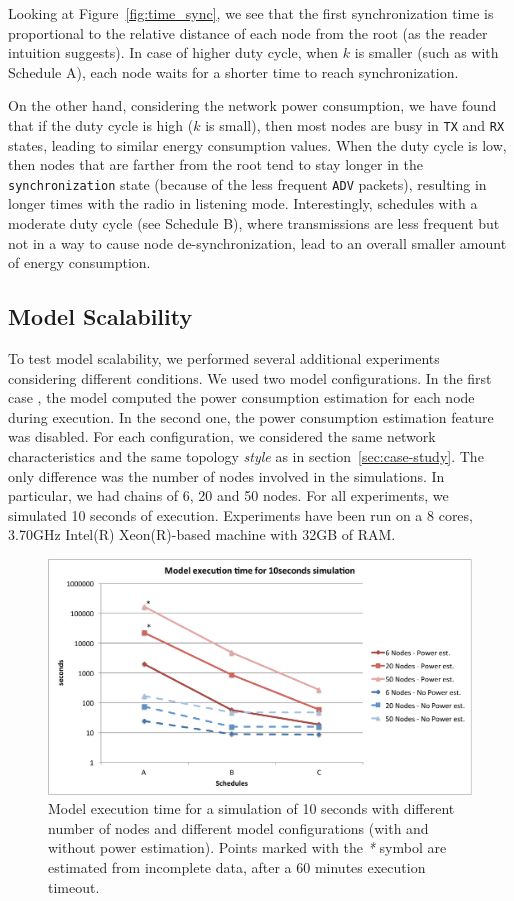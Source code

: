Looking at Figure~\ref{fig:time_sync}, we see that the first synchronization time is proportional to the relative distance of each node from the root (as the reader intuition suggests). In case of higher duty cycle, when $k$ is smaller (such as with Schedule A), each node waits for a shorter time to reach synchronization. 

On the other hand, considering the network power consumption, we have found that if the duty cycle is high ($k$ is small), then most nodes are busy in \texttt{TX} and \texttt{RX} states, leading to similar energy consumption values. When the duty cycle is low, then nodes that are farther from the root tend to stay longer in the \texttt{synchronization} state (because of the less frequent \texttt{ADV} packets), resulting in longer times with the radio in listening mode. Interestingly, schedules with a moderate duty cycle (see Schedule B), where transmissions are less frequent but not in a way to cause node de-synchronization, lead to an overall smaller amount of energy consumption.

\subsection{Model Scalability}
\label{sec:scalability}

To test model scalability, we performed several additional experiments considering different conditions.
We used two model configurations. In the first case , the model computed the power consumption estimation for each node during execution. In the second one, the power consumption estimation feature was disabled.
For each configuration, we considered the same network characteristics and the same topology \emph{style} as in section~\ref{sec:case-study}. The only difference was the number of nodes involved in the simulations. In particular, we had chains of 6, 20 and 50 nodes.
For all experiments, we simulated 10 seconds of execution.
Experiments have been run on a 8 cores, 3.70GHz Intel(R) Xeon(R)-based machine with 32GB of RAM.

\begin{figure}[t]
\centering
\includegraphics[width=0.9\columnwidth]{figures/runtime}
\caption{\small Model execution time for a simulation of 10 seconds with different number of nodes and different model configurations (with and without power estimation). Points marked with the \emph{*} symbol are estimated from incomplete data, after a 60 minutes execution timeout.}
\label{fig:runtime}
\end{figure}

